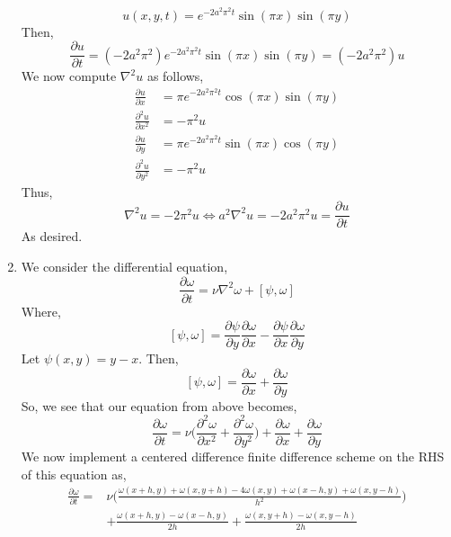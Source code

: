 \documentclass[letterpaper,10pt]{article}
\begin{document}
\begin{enumerate}
\[u(x,y,t)=e^{-2a^2\pi^2t}\sin(\pi x)\sin(\pi y)\]
Then,
\[\frac{\partial u}{\partial t}=(-2a^2\pi^2)e^{-2a^2\pi^2t}\sin(\pi x)\sin(\pi y)=(-2a^2\pi^2) u\]
We now compute $\nabla^2 u$ as follows,
\begin{align*}
\frac{\partial u}{\partial x} &= \pi e^{-2a^2\pi^2t}\cos(\pi x)\sin(\pi y)\\
\frac{\partial^2 u}{\partial x^2} &= -\pi^2u\\
\frac{\partial u}{\partial y} &= \pi e^{-2a^2\pi^2t}\sin(\pi x)\cos(\pi y)\\
\frac{\partial^2 u}{\partial y^2} &= -\pi^2u
\end{align*}
Thus,
\[\nabla^2 u=-2\pi^2u \Leftrightarrow a^2\nabla^2 u = -2a^2\pi^2 u=\frac{\partial u}{\partial t}\]
As desired.
\addtocounter{enumi}{4}
\item We consider the differential equation,
\[\frac{\partial \omega}{\partial t}=\nu \nabla^2\omega+[\psi,\omega]\]
Where,
\[[\psi,\omega]=\frac{\partial \psi}{\partial y}\frac{\partial \omega}{\partial x}-\frac{\partial \psi}{\partial x}\frac{\partial \omega}{\partial y}\]
Let $\psi(x,y)=y-x$. Then,
\[[\psi,\omega]=\frac{\partial \omega}{\partial x}+\frac{\partial \omega}{\partial y}\]
So, we see that our equation from above becomes,
\[\frac{\partial \omega}{\partial t}=\nu\bigg(\frac{\partial^2 \omega}{\partial x^2}+\frac{\partial^2 \omega}{\partial y^2}\bigg)+\frac{\partial \omega}{\partial x}+\frac{\partial \omega}{\partial y}\]
We now implement a centered difference finite difference scheme on the RHS of this equation as,
\begin{align*}
\frac{\partial \omega}{\partial t}=&\nu\bigg(\frac{\omega(x+h,y)+\omega(x,y+h)-4\omega(x,y)+\omega(x-h,y)+\omega(x,y-h)}{h^2}\bigg)\\
&+\frac{\omega(x+h,y)-\omega(x-h,y)}{2h}+\frac{\omega(x,y+h)-\omega(x,y-h)}{2h}
\end{align*}
\end{enumerate}
\end{document}
